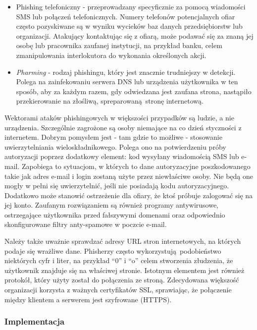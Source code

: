 \documentclass[12pt,twoside]{article}
\begin{document}
\begin{itemize}
	\item Phishing telefoniczny - przeprowadzany specyficznie za pomocą wiadomości SMS lub połączeń telefonicznych. Numery telefonów potencjalnych ofiar często pozyskiwane są w wyniku wycieków baz danych przedsiębiorstw lub organizacji. Atakujący kontaktując się z ofiarą, może podawać się za znaną jej osobę lub pracownika zaufanej instytucji, na przykład banku, celem zmanipulowania interlokutora do wykonania określonych akcji.
	\item \emph{Pharming} - rodzaj phishingu, który jest znacznie trudniejszy w detekcji. Polega na zainfekowaniu serwera DNS lub urządzenia użytkownika w ten sposób, aby za każdym razem, gdy odwiedzana jest zaufana strona, nastąpiło przekierowanie na złośliwą, spreparowaną stronę internetową. 
	
\end{itemize}

Wektorami ataków phishingowych w większości przypadków są ludzie, a nie urządzenia. Szczególnie zagrożone są osoby niemające na co dzień styczności z internetem. Dobrym pomysłem jest - tam gdzie to możliwe - stosowanie uwierzytelniania wieloskładnikowego. Polega ono na potwierdzeniu próby autoryzacji poprzez dodatkowy element: kod wysyłany wiadomością SMS lub e-mail. Zapobiega to sytuacjom, w których to dane autoryzacyjne poszkodowanego takie jak adres e-mail i login zostaną użyte przez niewłaściwe osoby. Nie będą one mogły w pełni się uwierzytelnić, jeśli nie posiadają kodu autoryzacyjnego. Dodatkowo może stanowić ostrzeżenie dla ofiary, że ktoś próbuje zalogować się na jej konto. Zaufanym rozwiązaniem są również programy antywirusowe, ostrzegające użytkownika przed fałszywymi domenami oraz odpowiednio skonfigurowane filtry anty-spamowe w poczcie e-mail.

Należy także uważnie sprawdzać adresy URL stron internetowych, na których podaje się wrażliwe dane. Phisherzy często wykorzystują podobieństwo niektórych cyfr i liter, na przykład ``0'' i ``o'' celem stworzenia złudzenia, że użytkownik znajduje się na właściwej stronie. Istotnym elementem jest również protokół, który użyty został do połączenia ze stroną. Zdecydowana większość organizacji korzysta z ważnych certyfikatów SSL, sprawiając, że połączenie między klientem a serwerem jest szyfrowane (HTTPS).

\subsubsection{Implementacja}
\end{document}
